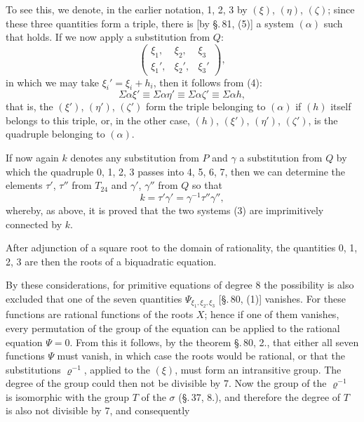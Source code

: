 
To see this, we denote, in the earlier notation, 1, 2, 3 by $(\xi)$, $(\eta)$, $(\zeta)$; since these three quantities form a triple, there is [by \S.\,81, (5)] a system $(\alpha)$ such that
holds. If we now apply a substitution from $Q$:
\[
\begin{pmatrix} \xi_1, & \xi_2, & \xi_3 \\ \xi_1', & \xi_2', & \xi_3' \end{pmatrix},
\]
in which we may take $\xi_i' = \xi_i + h_i$, then it follows from (4):
\[
\Sigma\alpha\xi' \equiv \Sigma\alpha\eta' \equiv \Sigma\alpha\zeta' \equiv \Sigma\alpha h,
\]
that is, the $(\xi')$, $(\eta')$, $(\zeta')$ form the triple belonging to $(\alpha)$ if $(h)$ itself belongs to this triple, or, in the other case, $(h)$, $(\xi')$, $(\eta')$, $(\zeta')$, is the quadruple belonging to $(\alpha)$.

If now again $k$ denotes any substitution from $P$ and $\gamma$ a substitution from $Q$ by which the quadruple 0, 1, 2, 3 passes into 4, 5, 6, 7, then we can determine the elements $\tau'$, $\tau''$ from $T_{24}$ and $\gamma'$, $\gamma''$ from $Q$ so that
\[
k = \tau'\gamma' = \gamma^{-1}\tau''\gamma'',
\]
whereby, as above, it is proved that the two systems (3) are imprimitively connected by $k$.

After adjunction of a square root to the domain of rationality, the quantities 0, 1, 2, 3 are then the roots of a biquadratic equation.

By these considerations, for primitive equations of degree 8 the possibility is also excluded that one of the seven quantities $\Psi_{\xi_1,\xi_2,\xi_3}$ [\S.\,80, (1)] vanishes. For these functions are rational functions of the roots $X$; hence if one of them vanishes, every permutation of the group of the equation can be applied to the rational equation $\Psi = 0$. From this it follows, by the theorem \S.\,80, 2., that either all seven functions $\Psi$ must vanish, in which case the roots would be rational, or that the substitutions $\varrho^{-1}$, applied to the $(\xi)$, must form an intransitive group. The degree of the group could then not be divisible by 7. Now the group of the $\varrho^{-1}$ is isomorphic with the group $T$ of the $\sigma$ (\S.\,37, 8.), and therefore the degree of $T$ is also not divisible by 7, and consequently
